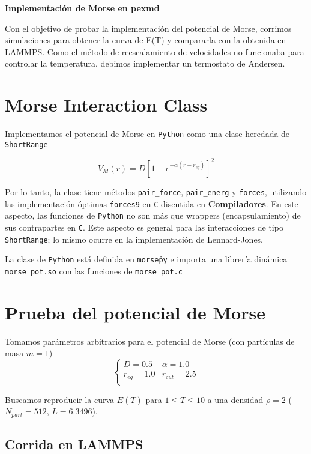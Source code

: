 \documentclass[twoside, 12pt]{article}
\begin{document}
	
\begin{center}
	{\fontsize{20pt}{10pt}\textbf{Implementación de Morse en pexmd}}
\end{center}

Con el objetivo de probar la implementación del potencial de Morse, corrimos simulaciones para obtener la curva de E(T) y compararla con la obtenida en LAMMPS. Como el método de reescalamiento de velocidades no funcionaba para controlar la temperatura, debimos implementar un termostato de Andersen. 

\section{Morse Interaction Class}

Implementamos el potencial de Morse en \texttt{Python} como una clase heredada de \texttt{ShortRange}

\[ V_{M} (r) = D\left[1-e^{-\alpha (r-r_{eq})}\right]^2\]

Por lo tanto, la clase tiene métodos \texttt{pair\_force}, \texttt{pair\_energ} y \texttt{forces}, utilizando las implementación óptimas \texttt{forces9} en \texttt{C} discutida en \textbf{Compiladores}. En este aspecto, las funciones de \texttt{Python} no son más que wrappers (encapsulamiento) de sus contrapartes en \texttt{C}. Este aspecto es general para las interacciones de tipo \texttt{ShortRange}; lo mismo ocurre en la implementación de Lennard-Jones. 

La clase de \texttt{Python} está definida en \texttt{morse\.py} e importa una librería dinámica \texttt{morse\_pot.so} con las funciones de \texttt{morse\_pot.c}

\section{Prueba del potencial de Morse}

Tomamos parámetros arbitrarios para el potencial de Morse (con partículas de masa $m=1$)
\[ \left\{\begin{matrix}
D = 0.5 & \alpha = 1.0 \\
r_{eq} = 1.0 & r_{cut} = 2.5\\
\end{matrix} \right. \]

Buscamos reproducir la curva $E(T)$ para $1\leq T\leq 10$ a una densidad $\rho = 2$ ($N_{part}=512$, $L=6.3496$).

\subsection{Corrida en LAMMPS}
\end{document}
